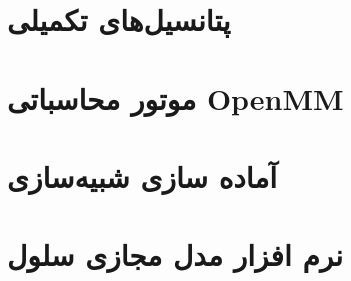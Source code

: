\section{
پتانسیل‌های تکمیلی
\label{sec:auxPotentials}
}




\section{
موتور محاسباتی
OpenMM
}


\section{
آماده سازی شبیه‌سازی
}


\section{
نرم افزار مدل مجازی سلول
}




